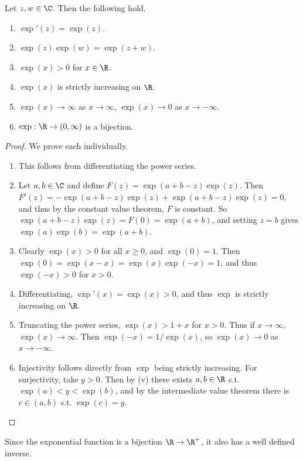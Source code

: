 \begin{proposition}\label{prop:exp}
	Let $z, w \in \C$. Then the following hold.
	\begin{enumerate}[label=(\roman*)]
		\item $\exp'(z) = \exp(z)$.
		\item $\exp(z)\exp(w) = \exp(z + w)$.
		\item $\exp(x) > 0$ for $x \in \R$.
		\item $\exp(x)$ is strictly increasing on $\R$.
		\item $\exp(x) \rightarrow \infty$ as $x \rightarrow \infty$, $\exp(x) \rightarrow 0$ as $x \rightarrow -\infty$.
		\item $\exp: \R \rightarrow (0, \infty)$ is a bijection.
	\end{enumerate}
\end{proposition}
\begin{proof}
	We prove each individually.
	\begin{enumerate}[label=(\roman*)]
		\item This follows from differentiating the power series.
		\item Let $a, b \in \C$ and define $F(z) = \exp(a + b - z)\exp(z)$. Then $F'(z) = -\exp(a + b - z)\exp(z) + \exp(a + b - z)\exp(z) = 0$, and thus by the constant value theorem, $F$ is constant. So $\exp(a + b - z)\exp(z) = F(0) = \exp(a +  b)$, and setting $z = b$ gives $\exp(a) \exp(b) = \exp(a + b)$.
		\item Clearly $\exp(x) > 0$ for all $x \geq 0$, and $\exp(0) = 1$. Then $\exp(0) = \exp(x - x) = \exp(x) \exp(-x) = 1$, and thus $\exp(-x) > 0$ for $x > 0$.
		\item Differentiating, $\exp'(x) = \exp(x) > 0$, and thus $\exp$ is strictly increasing on $\R$.
		\item Truncating the power series, $\exp(x) > 1 + x$ for $x > 0$. Thus if $x \rightarrow \infty$, $\exp(x) \rightarrow \infty$. Then $\exp(-x) = 1/\exp (x)$, so $\exp(x) \rightarrow 0$ as $x \rightarrow - \infty$.
		\item Injectivity follows directly from $\exp$ being strictly increasing. For surjectivity, take $y > 0$. Then by (v) there exists $a, b \in \R$ s.t. $\exp(a) < y < \exp(b)$, and by the intermediate value theorem there is $c \in (a, b)$ s.t. $\exp(c) = y$. \qedhere
	\end{enumerate}
\end{proof}

Since the exponential function is a bijection $\R \rightarrow \R^+$, it also has a well defined inverse.

